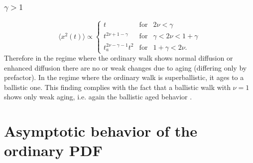 \subsubsection{$\gamma> 1$ }
\begin{equation}
  \langle x^2(t) \rangle \propto  \left\{
  \begin{array}{lll}
    t & \mathrm{for} & 2\nu < \gamma  \\
    t^{2\nu+1-\gamma} &\mathrm{for} & \gamma <2 \nu < 1+\gamma \\ 
   t_a^{2\nu-\gamma-1 }t^2 & \mathrm{for} & 1+\gamma < 2\nu.
  \end{array}
  \right.
\end{equation}
Therefore in the regime where the ordinary walk shows normal diffusion or enhanced diffusion there are no or weak changes due to aging (differing only by prefactor). 
In the regime where the ordinary walk is superballistic, it ages to a ballistic one. This finding complies with the fact that a ballistic walk with $\nu = 1$ shows only weak aging, i.e. again the ballistic aged behavior \cite{Magdziarz, Froemberg}. 


\section{Asymptotic behavior of the ordinary PDF} \label{sec:calcPDF}

